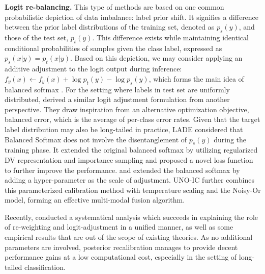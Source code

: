 \textbf{Logit re-balancing.} This type of methods are based on one common probabilistic depiction of data imbalance: label prior shift. It signifies a difference between the prior label distributions of the training set, denoted as $p_s(y)$, and those of the test set, $p_t(y)$. This difference exists while maintaining identical conditional probabilities of
samples given the class label, expressed as $p_s(x|y) = p_t(x|y)$. Based on this depiction, we may consider applying an additive adjustment to the logit output during inference: $f_y(x) \leftarrow f_y(x) + \log p_t(y) -\log p_s(y)$, which forms the main idea of balanced softmax \cite{hong2021disentangling, ren2020balanced}. For the setting where labels in test set are uniformly distributed, \cite{menon2021long} derived a similar logit adjustment formulation from another perspective. They draw inspiration from an alternative optimization objective, balanced error, which is the average of per-class error rates. Given that the target label distribution may also be long-tailed in practice, LADE \cite{hong2021disentangling} considered that Balanced Softmax does not involve the disentanglement of $p_s(y)$ during the training phase. It extended the original balanced softmax by utilizing regularized DV representation and importance sampling and proposed a novel loss function to further improve the performance. \cite{ye2022identifying} and \cite{tian2020posterior} extended the balanced softmax by adding a hyper-parameter as the scale of adjustment. UNO-IC \cite{tian2020posterior} further combines this parameterized calibration method with temperature scaling and the Noisy-Or model, forming an effective multi-modal fusion algorithm.

Recently, \cite{wang2024unified} conducted a systematical analysis which succeeds in explaining the role of re-weighting and logit-adjustment in a unified manner, as well as some empirical results that are out of the scope of existing theories. As no additional parameters are involved, posterior recalibration manages to provide decent performance gains at a low computational cost, especially in the setting of long-tailed classification.




